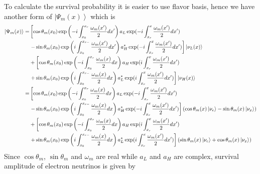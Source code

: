 \documentclass[letterpaper,12pt,english]{sphinxmanual}
\newcommand{\ket}[1]{\left| #1\right\rangle}
\begin{document}
To calculate the survival probability it is easier to use flavor basis, hence we have another form of \(\ket{\Psi_m(x)}\) which is
\begin{gather}
\begin{split}\ket{\Psi_{m}(x)}= &  \left[ \cos\theta_m(x_0) \exp\left( -i \int_{x_0}^{x_{r}} \frac{\omega_m(x')}{2} dx'   \right)   a_L \exp( -i \int_{x_r}^x \frac{\omega_m(x')}{2}dx' ) \right. \\
&  \left. - \sin\theta_m(x_{0}) \exp\left( i \int_{x_0}^{x_{r-}} \frac{\omega_m(x')}{2} dx' \right)    a_H^* \exp( -i \int_{x_r}^x \frac{\omega_m(x')}{2}dx' )  \right] \ket{\nu_L(x)}\\
& + \left[  \cos\theta_m(x_0) \exp\left( -i \int_{x_0}^{x_{r}} \frac{\omega_m(x)}{2} dx   \right) a_H \exp( i\int_{x_r}^x \frac{\omega_m(x')}{2}dx' ) \right. \\
& \left. + \sin\theta_m(x_{0}) \exp\left( i \int_{x_0}^{x_{r-}} \frac{\omega_m(x)}{2} dx \right)   a_L^* \exp( i\int_{x_r}^x \frac{\omega_m(x')}{2}dx' ) \right]  \ket{\nu_H(x)} \\
=&  \left[ \cos\theta_m(x_0) \exp\left( -i \int_{x_0}^{x_{r}} \frac{\omega_m(x)}{2} dx   \right)   a_L \exp( -i \int_{x_r}^x \frac{\omega_m(x')}{2}dx' ) \right. \\
&  \left. - \sin\theta_m(x_{0}) \exp\left( i \int_{x_0}^{x_{r-}} \frac{\omega_m(x)}{2} dx \right)    a_H^* \exp( -i \int_{x_r}^x \frac{\omega_m(x')}{2}dx' )  \right] ( \cos\theta_m(x)\ket{\nu_e} - \sin\theta_m(x)\ket{\nu_x} )\\
& + \left[  \cos\theta_m(x_0) \exp\left( -i \int_{x_0}^{x_{r}} \frac{\omega_m(x)}{2} dx   \right) a_H \exp( i\int_{x_r}^x \frac{\omega_m(x')}{2}dx' ) \right. \\
& \left. + \sin\theta_m(x_{0}) \exp\left( i \int_{x_0}^{x_{r-}} \frac{\omega_m(x)}{2} dx \right)   a_L^* \exp( i\int_{x_r}^x \frac{\omega_m(x')}{2}dx' ) \right] ( \sin\theta_m(x)\ket{\nu_e} + \cos\theta_m(x)\ket{\nu_x})\end{split}\notag
\end{gather}
Since \(\cos\theta_m\), \(\sin\theta_m\) and \(\omega_m\) are real while \(a_L\) and \(a_H\) are complex, survival amplitude of electron neutrinos is given by
\end{document}
